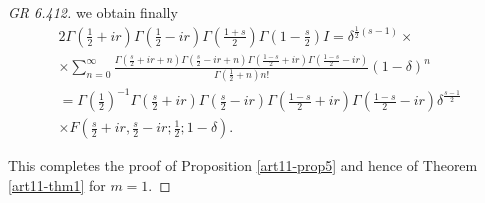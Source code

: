 \begin{proof}
[GR 6.412] we obtain finally
\begin{gather*}
2 \Gamma \left(\frac{1}{2} + ir \right) \Gamma \left(\frac{1}{2} - ir \right) \Gamma \left(\frac{1+s}{2} \right) \Gamma \left( 1-\frac{s}{2}\right) I = \delta^{\frac{1}{2} (s-1)} \times \\
\times \sum\limits^\infty_{n=0}  \frac{\Gamma \left(\frac{s}{2} + ir + n \right) \Gamma \left(\frac{s}{2} - ir + n\right) \Gamma \left(\frac{1-s}{2}+ ir \right) \Gamma \left(\frac{1-s}{2} - ir \right)}{\Gamma \left(\frac{1}{2} +n \right) n!} (1-\delta)^n\\
= \Gamma \left(\frac{1}{2}  \right)^{-1} \Gamma \left(\frac{s}{2} +ir \right)  \Gamma \left(\frac{s}{2} - ir \right) \Gamma \left(\frac{1-s}{2} + ir \right) \Gamma \left(\frac{1-s}{2}- ir \right) \delta^{\frac{s-1}{2}}\\
 \times  F \left(\frac{s}{2} + ir , \frac{s}{2} - ir ; \frac{1}{2}; 1 - \delta \right).
\end{gather*}

This completes the proof of Proposition \ref{art11-prop5} and hence of Theorem \eqref{art11-thm1} for $m=1$. 


\end{proof}
